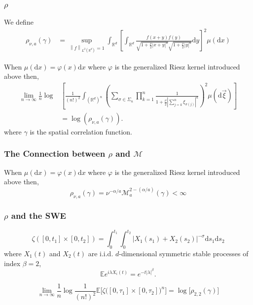 \documentclass{beamer}%
\numberwithin{equation}{section}
\newcommand{\R}{\mathbb{R}}
\newcommand{\Norm}[1]{\left\|  #1   \right\|}
\newcommand{\ud}{\ensuremath{\mathrm{d} }}
\begin{document}
		\begin{frame}[t]
		\frametitle{$\rho$}
		We define
					\begin{align*}
			\rho_{\nu,a}(\gamma) &= \sup_{\Norm{f}_{L^2(\R^d)} =1} \int_{\R^d} \left[ \int_{\R^d} \frac{f(x+y)f(y)}{\sqrt{1+\frac{\nu}{2}|x+y|^a } \sqrt{1+\frac{\nu}{2}|y|^a} } \ud y \right]^2 \mu(\ud x)
			\end{align*}

		\begin{theorem}
			When $\mu(\ud x) = \varphi(x) \ud x$ where $\varphi$ is the generalized Riesz kernel introduced above then,
			\begin{align*}
			\lim_{n \to \infty} \frac{1}{n} \log & \left[ \frac{1}{(n!)^2} \int_{(\R^d)^n} \left( \sum_{\sigma \in \Sigma_n} \prod_{k=1}^n \frac{1}{1+ \frac{\nu}{2}|\sum_{j=k}^n \xi_{\sigma(j)}|^a}\right)^2 \mu (\ud \vec{\xi})\right]
			\\& = \log\left( \rho_{\nu, a}\left(\gamma\right) \right).
			\end{align*}
			where $\gamma$ is the spatial correlation function.
		\end{theorem}

	\end{frame}

	\begin{frame}
		\frametitle{The Connection between $\rho$ and $\mathcal{M}$}
					\begin{theorem}
				When $\mu(\ud x) = \varphi(x) \ud x$ where $\varphi$ is the generalized Riesz kernel introduced above then,
				\[
				\rho_{\nu,a}(\gamma) = \nu^{-\alpha/a} \mathcal{M}_a^{2-(\alpha / a)}(\gamma)<\infty
				\]
			\end{theorem}
	\end{frame}

	\begin{frame}[t]
	\frametitle{$\rho$ and the SWE}
	\[
	\zeta\left([0,t_1]\times [0,t_2]\right) = \int_0^{t_1} \int_0^{t_2} | X_1(s_1) + X_2(s_2)|^{-\sigma} \ud s_1 \ud s_2
	\]
	where $X_1(t)$ and $X_2(t)$ are i.i.d. $d$-dimensional symmetric stable processes of index $ \beta = 2$,
	\[
	\mathbb{E}e^{i\lambda X_i(t)} = e^{-t|\lambda|^\beta}.
	\]

\begin{theorem}[X. Chen]
	\[
		\lim_{n \to \infty} \frac{1}{n} \log \frac{1}{(n!)^2} 	\mathbb{E}\bigg[ \zeta \big( [0,\tau_1] \times [0,\tau_2] \big)^n \bigg] = \log\big[\rho_{2,2}(\gamma)\big]
	\]
\end{theorem}
	\end{frame}
\end{document}

